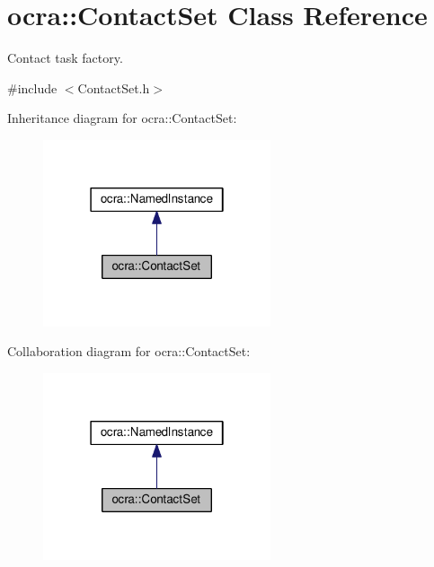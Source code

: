 \hypertarget{classocra_1_1ContactSet}{}\section{ocra\+:\+:Contact\+Set Class Reference}
\label{classocra_1_1ContactSet}


Contact task factory.  




{\ttfamily \#include $<$Contact\+Set.\+h$>$}



Inheritance diagram for ocra\+:\+:Contact\+Set\+:
\nopagebreak
\begin{figure}[H]
\begin{center}
\leavevmode
\includegraphics[width=190pt]{d5/de0/classocra_1_1ContactSet__inherit__graph}
\end{center}
\end{figure}


Collaboration diagram for ocra\+:\+:Contact\+Set\+:
\nopagebreak
\begin{figure}[H]
\begin{center}
\leavevmode
\includegraphics[width=190pt]{da/d52/classocra_1_1ContactSet__coll__graph}
\end{center}
\end{figure}
